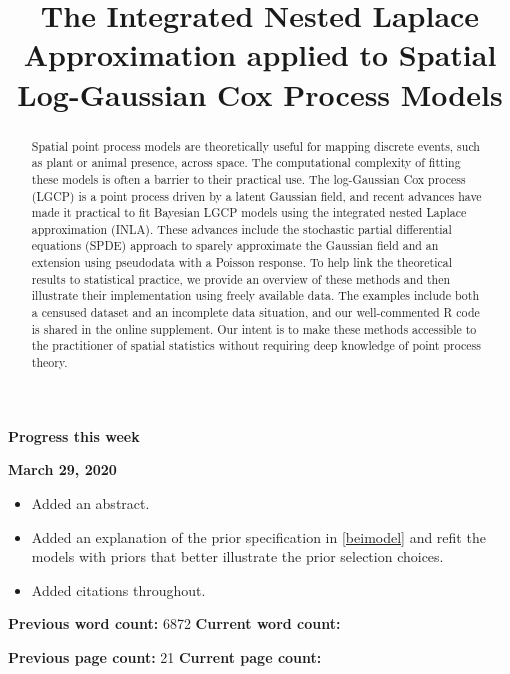 \documentclass[]{interact}
\begin{document}
{\Large\bf Progress this week}

{\large\bf March 29, 2020}

\begin{itemize}

\item Added an abstract.

\item Added an explanation of the prior specification in \ref{beimodel} and
refit the models with priors that better illustrate the prior selection
choices.

\item Added citations throughout.

\end{itemize}

\vfill

\textbf{Previous word count:} 6872 \hfill \textbf{Current word count:} 

\textbf{Previous page count:} 21 \hfill \textbf{Current page count:} 

\pagebreak


\title{The Integrated Nested Laplace Approximation applied to Spatial Log-Gaussian Cox Process Models}

\author{
}

\maketitle

\begin{abstract}
Spatial point process models are theoretically useful for mapping discrete
events, such as plant or animal presence, across space. The computational
complexity of fitting these models is often a barrier to their practical use.
The log-Gaussian Cox process (LGCP) is a point process driven by a latent
Gaussian field, and recent advances have made it practical to fit Bayesian LGCP
models using the integrated nested Laplace approximation (INLA). These advances
include the stochastic partial differential equations (SPDE) approach to
sparely approximate the Gaussian field and an extension using pseudodata with
a Poisson response. To help link the theoretical results to statistical
practice, we provide an overview of these methods and then illustrate their
implementation using freely available data. The examples include both a
censused dataset and an incomplete data situation, and our well-commented R
code is shared in the online supplement. Our intent is to make these methods
accessible to the practitioner of spatial statistics without requiring deep
knowledge of point process theory.
\end{abstract}
\end{document}
